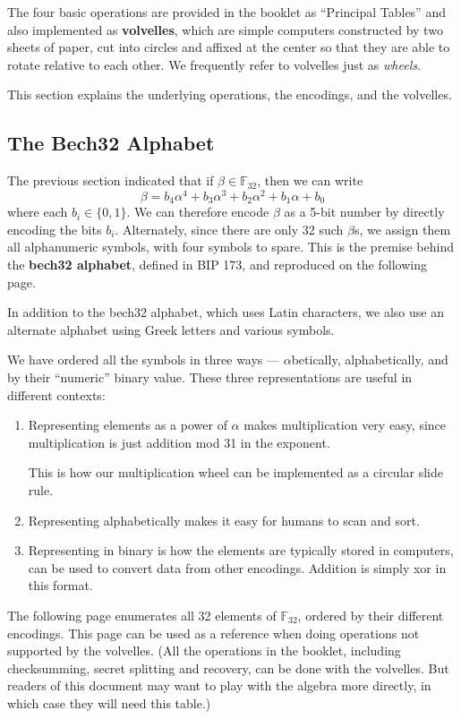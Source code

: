 \documentclass[letterpaper]{article}
\newcommand{\fttwo}{\mathbb{F}_{32}}
\begin{document}
The four basic operations are provided in the booklet as ``Principal Tables''
and also implemented as \textbf{volvelles}, which are simple computers constructed
by two sheets of paper, cut into circles and affixed at the center so that they
are able to rotate relative to each other. We frequently refer to volvelles just
as \emph{wheels}.

This section explains the underlying operations, the encodings, and the volvelles.

\subsection{The Bech32 Alphabet}

The previous section indicated that if $\beta\in\fttwo$, then we can write
\[ \beta = b_4\alpha^4 + b_3\alpha^3 + b_2\alpha^2 + b_1\alpha + b_0 \]
where each $b_i\in\{0, 1\}$. We can therefore encode $\beta$ as a 5-bit
number by directly encoding the bits $b_i$. Alternately, since there are
only 32 such $\beta$s, we assign them all alphanumeric symbols, with four
symbols to spare. This is the premise behind the \textbf{bech32 alphabet},
defined in BIP 173, and reproduced on the following page.

In addition to the bech32 alphabet, which uses Latin characters, we also use
an alternate alphabet using Greek letters and various symbols.

We have ordered all the symbols in three ways --- $\alpha$betically,
alphabetically, and by their ``numeric'' binary value. These three
representations are useful in different contexts:
\begin{enumerate}
\item Representing elements as a power of $\alpha$ makes multiplication
very easy, since multiplication is just addition mod 31 in the exponent.

This is how our multiplication wheel can be implemented as a circular slide rule.
\item Representing alphabetically makes it easy for humans to scan and sort.
\item Representing in binary is how the elements are typically stored in
computers, can be used to convert data from other encodings. Addition is
simply xor in this format.
\end{enumerate}

The following page enumerates all 32 elements of $\fttwo$, ordered by
their different encodings. This page can be used as a reference when
doing operations not supported by the volvelles. (All the operations in
the booklet, including checksumming, secret splitting and recovery, can
be done with the volvelles. But readers of this document may want to
play with the algebra more directly, in which case they will need this
table.)
\end{document}
